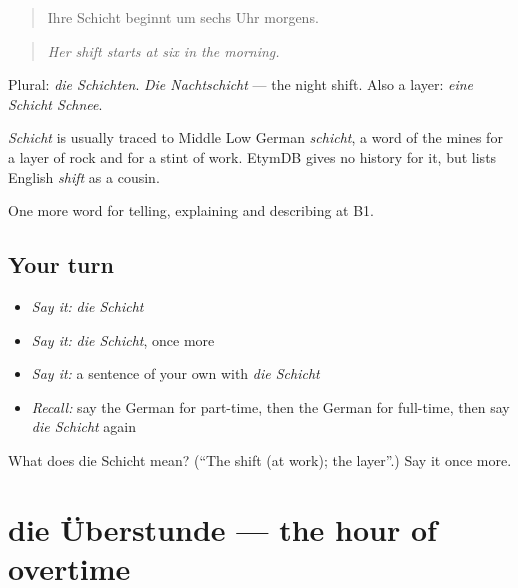 \begin{quote}
Ihre Schicht beginnt um sechs Uhr morgens.
\end{quote}

\begin{quote}
\emph{Her shift starts at six in the morning.}
\end{quote}

Plural: \emph{die Schichten}. \emph{Die Nachtschicht} — the night shift. Also a layer: \emph{eine Schicht Schnee}.

\begin{cousinweb}
\emph{Schicht} is usually traced to Middle Low German \emph{schicht}, a word of the mines for a layer of rock and for a stint of work. EtymDB gives no history for it, but lists English \emph{shift} as a cousin.
\end{cousinweb}

\begin{grammarlens}[title={What you've built}]
One more word for telling, explaining and describing at B1.
\end{grammarlens}

\subsection*{Your turn}
\begin{itemize}
\raggedright
  \item \emph{Say it:} \emph{die Schicht}
  \item \emph{Say it:} \emph{die Schicht}, once more
  \item \emph{Say it:} a sentence of your own with \emph{die Schicht}
  \item \emph{Recall:} say the German for part-time, then the German for full-time, then say \emph{die Schicht} again
\end{itemize}

\begin{tcolorbox}[breakable,colback=teal!4,colframe=teal!35!black,title={Before you move on}]
What does die Schicht mean? (\textquotedblleft{}The shift (at work); the layer\textquotedblright{}.) Say it once more.
\end{tcolorbox}
\section[die Überstunde]{die Überstunde — the hour of overtime}

\label{lesson:GE-C351-ueberstunde}



